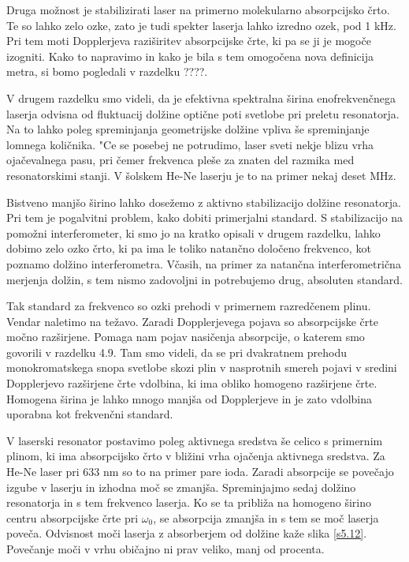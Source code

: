 Druga možnost je stabilizirati laser na primerno molekularno absorpcijsko
črto. Te so lahko zelo ozke, zato je tudi spekter laserja lahko izredno
ozek, pod 1 kHz. Pri tem moti Dopplerjeva raziširitev absorpcijske črte,
ki pa se ji je mogoče izogniti. Kako to napravimo in kako je bila s tem
omogočena nova definicija metra, si bomo pogledali v razdelku ????.


V drugem razdelku smo videli, da je efektivna spektralna širina
eno\-frekvenčnega laserja odvisna od fluktuacij dolžine optične poti
svetlobe pri preletu resonatorja. Na to lahko poleg spreminjanja
geometrijske dolžine vpliva še spreminjanje lomnega količnika. "Ce se
posebej ne potrudimo, laser sveti nekje blizu vrha ojačevalnega pasu, pri
čemer frekvenca pleše za znaten del razmika med resonatorskimi stanji. V
šolskem He-Ne laserju je to na primer nekaj deset MHz.

Bistveno manjšo širino lahko dosežemo z aktivno stabilizacijo dolžine
resonatorja. Pri tem je pogalvitni problem, kako dobiti primerjalni
standard. S stabilizacijo na pomožni interferometer, ki smo jo na kratko
opisali v drugem razdelku, lahko dobimo zelo ozko črto, ki pa ima le toliko
natančno določeno frekvenco, kot poznamo dolžino interferometra. Včasih,
na primer za natančna interferometrična merjenja dolžin, s tem nismo
zadovoljni in potrebujemo drug, absoluten standard.

Tak standard za frekvenco so ozki prehodi v primernem razredčenem plinu.
Vendar naletimo na težavo. Zaradi Dopplerjevega pojava so absorpcijske
črte močno razširjene. Pomaga nam pojav nasičenja absorpcije, o katerem
smo govorili v razdelku 4.9. Tam smo videli, da se pri dvakratnem prehodu
monokromatskega snopa svetlobe skozi plin v nasprotnih smereh pojavi v
sredini Dopplerjevo razširjene črte vdolbina, ki ima obliko homogeno
razširjene črte. Homogena širina je lahko mnogo manjša od Dopplerjeve in
je zato vdolbina uporabna kot frekvenčni standard.

V laserski resonator postavimo poleg aktivnega sredstva še celico s
primernim plinom, ki ima absorpcijsko črto v bližini vrha ojačenja
aktivnega sredstva. Za He-Ne laser pri 633 nm so to na primer pare ioda.
Zaradi absorpcije se povečajo izgube v laserju in izhodna moč se zmanjša.
Spreminjajmo sedaj dolžino resonatorja in s tem frekvenco laserja. Ko se ta
približa na homogeno širino centru absorpcijske črte pri $\omega_0$, se
absorpcija zmanjša in s tem se moč laserja poveča. Odvisnost moči
laserja z absorberjem od dolžine kaže slika \ref{s5.12}. Povečanje moči
v vrhu običajno ni prav veliko, manj od procenta.


